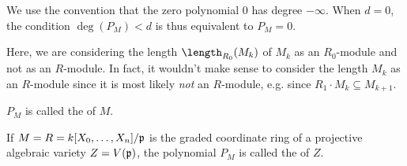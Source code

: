 \documentclass[a4paper,parskip=half,numbers=enddot, DIV=12, headheight=30pt]{scrreprt}
\begin{document}
\begin{rem*}
	\begin{alphanumerate}
		\item 
		We use the convention that the zero polynomial 0 has degree $-\infty$. When $d=0$, the condition $\deg(P_M) <d$ is thus equivalent to $P_M = 0$.
		\item  Here, we are considering the length $\length_{R_0}(M_k)$ of $M_k$ as an $R_0$-module and not as an $R$-module. In fact, it wouldn't make sense to consider the length $M_k$ as an $R$-module since it is most likely \emph{not} an $R$-module, e.g. since $R_1\cdot M_k\subseteq M_{k+1}$.
	\end{alphanumerate}
\end{rem*}
\begin{defi}
    $P_M$ is called the  of $M$.
\end{defi}
\begin{defi} 
    If $M=R=k[X_0,\ldots, X_n]/\mathfrak{p}$ is the graded coordinate ring of a projective algebraic variety $Z=V(\mathfrak{p})$, the polynomial $P_M$ is called the  of $Z$.
\end{defi}
\end{document}
